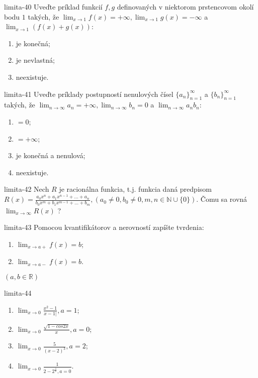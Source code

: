 \begin{defproblem}{limita-40}
Uveďte príklad funkcií $f,g$ definovaných v niektorom prstencovom okolí bodu $1$ takých, že $\lim_{x \rightarrow 1} f(x)=+\infty,\lim_{x \rightarrow 1} g(x)=-\infty$ a $\lim_{x \rightarrow 1} (f(x)+g(x))$:
\begin{enumerate}
\item je konečná;
\item je nevlastná;
\item neexistuje.
\end{enumerate}
\end{defproblem}

\begin{defproblem}{limita-41}
Uveďte príklady postupností nenulových čísel ${\{a_n\}}_{n=1}^\infty$ a ${\{b_n\}}_{n=1}^\infty$ takých, že $\lim_{n \rightarrow \infty} a_n=+\infty,\lim_{n \rightarrow \infty} b_n=0$ a $\lim_{n \rightarrow \infty} a_nb_n$:
\begin{enumerate}
\item $=0$;
\item $=+\infty$;
\item je konečná a nenulová;
\item neexistuje.
\end{enumerate}
\end{defproblem}

\begin{defproblem}{limita-42}
Nech $R$ je racionálna funkcia, t.j. funkcia daná predpisom $R(x)=\frac{a_0x^n+a_1x^{n-1}+...+a_n}{b_0x^m+b_1x^{m-1}+...+b_m},(a_0 \neq 0, b_0 \neq 0,m,n \in \mathbb{N} \cup \{ 0\})$. Čomu sa rovná $\lim_{x \rightarrow \infty} R(x)$ ? 
\end{defproblem}

\begin{defproblem}{limita-43}
Pomocou kvantifikátorov a nerovností zapíšte tvrdenia:
\begin{enumerate}
\item $\lim_{x \rightarrow a+} f(x)=b$;
\item $\lim_{x \rightarrow a-} f(x)=b$.
\end{enumerate}
$(a,b \in \mathbb{R})$
\end{defproblem}

\begin{defproblem}{limita-44}
\begin{multicols}{2}
\begin{enumerate}
    \item $\lim_{{x \rightarrow 0}} \frac{x^2-1}{x-1|},a=1$;
    \item $\lim_{{x \rightarrow 0}} \frac{\sqrt{1-cos 2x}}{x},a=0$;
    \item $\lim_{{x \rightarrow 0}} \frac{5}{(x-2)^3},a=2$;
    \item $\lim_{{x \rightarrow 0}} \frac{1}{2-2^{\frac{1}{x}},a=0}$.
\end{enumerate}
\end{multicols}
\end{defproblem}

